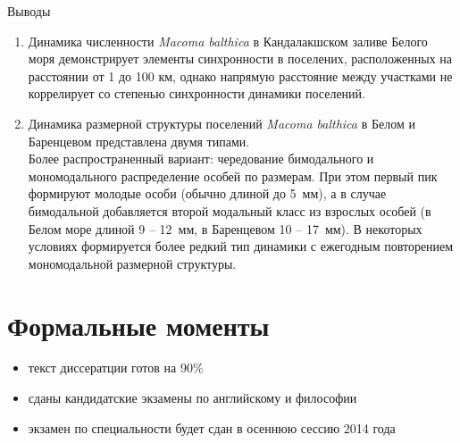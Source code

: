 \documentclass{beamer}
\begin{document}
\begin{small}
\begin{frame}{Выводы}
	\begin{enumerate}
\addtocounter{enumi}{9}
		\item Динамика численности {\it Macoma balthica} в Кандалакшском заливе Белого моря демонстрирует элементы синхронности в поселених, расположенных на расстоянии от 1 до 100 км, однако напрямую расстояние между участками не коррелирует со степенью синхронности динамики поселений.
		\item Динамика размерной структуры поселений {\it Macoma balthica} в Белом и Баренцевом представлена двумя типами. \\
Более распространенный вариант: чередование бимодального и мономодального распределение особей по размерам. При этом первый пик формируют молодые особи (обычно длиной до 5~мм), а в случае бимодальной добавляется второй модальный класс из взрослых особей (в Белом море длиной 9 -- 12~мм, в Баренцевом 10 -- 17~мм). %
В некоторых условиях формируется более редкий тип динамики с ежегодным повторением мономодальной размерной структуры. %
	\end{enumerate}
\end{frame}

\end{small}

		\section*{Формальные моменты}
\begin{frame}{}
\begin{itemize}
	\item{текст диссератции готов на 90\%}
	\item{сданы кандидатские экзамены по английскому и философии}
	\item{экзамен по специальности будет сдан в осеннюю сессию 2014 года}
\end{itemize}
\end{frame}
\end{document}

